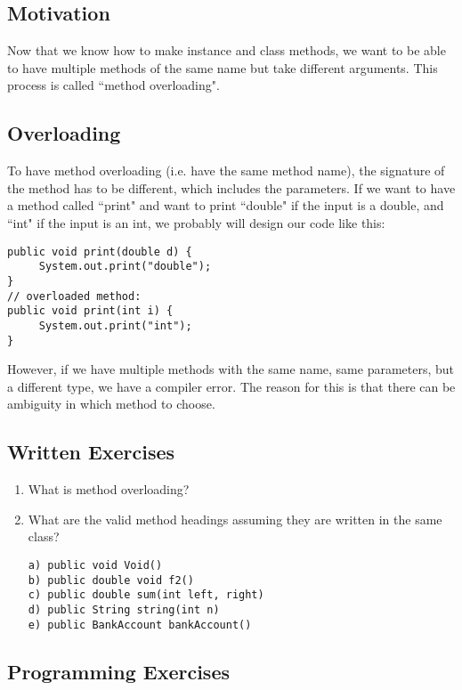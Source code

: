 
\subsection{Motivation}
Now that we know how to make instance and class methods, we want to be able to have multiple methods of the same name but take different arguments. This process is called ``method overloading".

\subsection{Overloading}
To have method overloading (i.e. have the same method name), the signature of the method has to be different, which includes the parameters. If we want to have a method called ``print" and want to print ``double" if the input is a double, and ``int" if the input is an int, we probably will design our code like this:
\begin{lstlisting}
public void print(double d) {
     System.out.print("double");
}
// overloaded method:
public void print(int i) {
     System.out.print("int");
}
\end{lstlisting}
However, if we have multiple methods with the same name, same parameters, but a different type, we have a compiler error. The reason for this is that there can be ambiguity in which method to choose.

\subsection{Written Exercises}

\setcounter{counter}{1}
\begin{enumerate}[label={\arabic{counter}\addtocounter{counter}{1}}.]

\item What is method overloading? 

\item What are the valid method headings assuming they are written in the same class?
\begin{lstlisting}
a) public void Void()
b) public double void f2()
c) public double sum(int left, right)
d) public String string(int n)
e) public BankAccount bankAccount()
\end{lstlisting}

\end{enumerate}

\subsection{Programming Exercises}